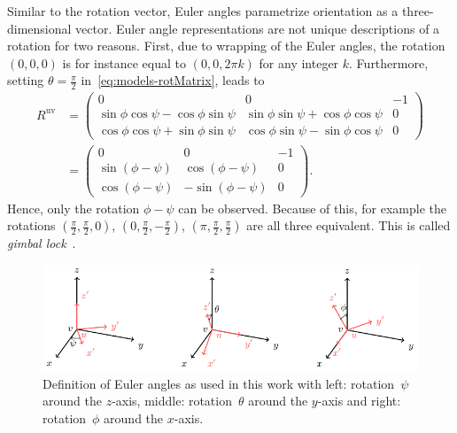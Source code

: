 Similar to the rotation vector, Euler angles parametrize orientation as a three-dimensional vector. Euler angle representations are not unique descriptions of a rotation for two reasons. First, due to wrapping of the Euler angles, the rotation $(0, 0, 0)$ is for instance equal to $(0, 0, 2 \pi k)$ for any integer $k$.  Furthermore, setting $\theta = \tfrac{\pi}{2}$ in~\eqref{eq:models-rotMatrix}, leads to
\begin{align}
R^\text{uv} &= \begin{pmatrix} 0 & 0 & -1 \\ 
\sin \phi \cos \psi - \cos \phi \sin \psi & \sin \phi \sin \psi + \cos \phi \cos \psi & 0 \\ 
\cos \phi \cos \psi + \sin \phi \sin \psi & \cos \phi \sin \psi - \sin \phi \cos \psi & 0 \end{pmatrix} \nonumber \\
&= \begin{pmatrix} 0 & 0 & -1 \\ 
\sin (\phi - \psi) & \cos (\phi - \psi) & 0 \\ 
\cos (\phi - \psi) & - \sin (\phi - \psi) & 0 \end{pmatrix}.
\end{align}
Hence, only the rotation $\phi - \psi$ can be observed. Because of this, for example the rotations $(\tfrac{\pi}{2}, \tfrac{\pi}{2}, 0)$, $(0, \tfrac{\pi}{2}, -\tfrac{\pi}{2})$, $(\pi, \tfrac{\pi}{2},\tfrac{\pi}{2})$ are all three equivalent. This is called \emph{gimbal lock}~\citep{diebel:2006}. 

\begin{figure}
	\centering
	\includegraphics[scale = 1]{figure3_5.pdf}
		\caption{Definition of Euler angles as used in this work with left: rotation~$\psi$ around the $z$-axis, middle: rotation~$\theta$ around the $y$-axis and right: rotation~$\phi$ around the $x$-axis.}
	\label{fig:models-eulerAngles}
\end{figure}

